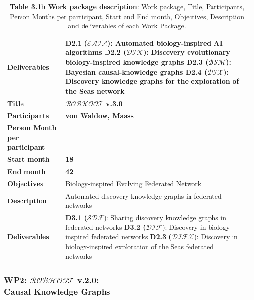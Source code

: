 \documentclass[11pt, a4paper]{article} %
\begin{document}
{\begin{table}[h!]
\begin{center}
\begin{tabular}{|m{3cm} || m{12cm} || m{1cm}|}
    \hline
    \rowcolor{piggypink!20}
    {\bf Deliverables} & {\bf D2.1 ($\mathcal{EAIA}$}): Automated biology-inspired AI algorithms        
                         {\bf D2.2 ($\mathcal{DIK}$}): Discovery evolutionary biology-inspired knowledge graphs
                         {\bf D2.3 ($\mathcal{BSM}$}): Bayesian causal-knowledge graphs                
                         {\bf D2.4 ($\mathcal{DIX}$}): Discovery knowledge graphs for the exploration of the Seas network  & \\
    \hline \hline\hline
    \rowcolor{piggypink!20}
    {\bf Title} & {\bf $\mathcal{ROBHOOT}$ v.3.0} &  \\
    \hline
    \rowcolor{piggypink!20}
    {\bf Participants} & {\bf von Waldow, Maass} & \\
    \hline
    \rowcolor{piggypink!20}
    {\bf Person Month per participant} & & \\
    \hline
    \rowcolor{piggypink!20}
    {\bf Start month} & {\bf 18} & \\
    \hline
    \rowcolor{piggypink!20}
    {\bf End month} & {\bf 42} & \\
    \hline
    \rowcolor{piggypink!20}
    {\bf Objectives} & Biology-inspired Evolving Federated Network & \\
    \hline
    \rowcolor{piggypink!20}
    {\bf Description} & Automated discovery knowledge graphs in federated networks & \\
    \hline
    \rowcolor{piggypink!20}
    {\bf Deliverables} & {\bf D3.1 ($\mathcal{SDF}$}): Sharing discovery knowledge graphs in federated networks
                         {\bf D3.2 ($\mathcal{DIF}$}): Discovery in biology-inspired federated networks 
                         {\bf D2.3 ($\mathcal{DIFX}$}): Discovery in biology-inspired exploration of the Seas federated networks  & \\
    \hline\hline\hline
  \end{tabular}
\end{center}
\caption*{{{\bf Table 3.1b Work package description}: Work package,
    Title, Participants, Person Months per participant, Start and End
    month, Objectives, Description and deliverables of each Work
    Package.}}
\end{table}


\subsubsection{{\bf WP2: $\mathcal{ROBHOOT}$ v.2.0}: \\
  Causal Knowledge Graphs}

}
\end{document}
